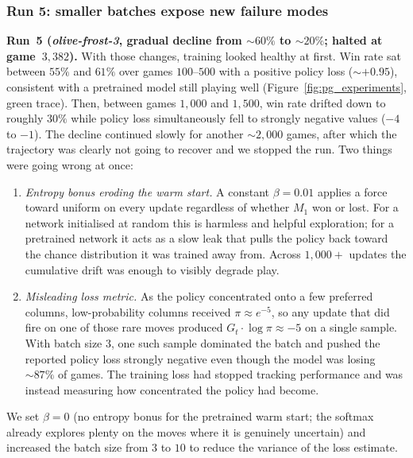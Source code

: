 \documentclass[11pt]{article}
\begin{document}
\subsubsection{Run 5: smaller batches expose new failure modes}
\label{sssec:pg_run5}

\textbf{Run~5 (\emph{olive-frost-3}, gradual decline from $\sim\!60\%$
to $\sim\!20\%$; halted at game~$3{,}382$).} With those changes,
training looked healthy at first. Win rate sat between $55\%$ and
$61\%$ over games $100$--$500$ with a positive policy loss
($\sim +0.95$), consistent with a pretrained model still playing well
(Figure~\ref{fig:pg_experiments}, green trace). Then, between games
$1{,}000$ and $1{,}500$, win rate drifted down to roughly $30\%$ while
policy loss simultaneously fell to strongly negative values
($-4$ to $-1$). The decline continued slowly for another $\sim 2{,}000$
games, after which the trajectory was clearly not going to recover
and we stopped the run. Two things were going wrong at once:

\begin{enumerate}
    \item \emph{Entropy bonus eroding the warm start.} A
    constant $\beta = 0.01$ applies a force toward uniform on every
    update regardless of whether $M_1$ won or lost. For a network
    initialised at random this is harmless and helpful exploration;
    for a pretrained network it acts as a slow leak that pulls the
    policy back toward the chance distribution it was trained away
    from. Across $1{,}000+$ updates the cumulative drift was enough to
    visibly degrade play.
    \item \emph{Misleading loss metric.} As the policy concentrated
    onto a few preferred columns, low-probability columns received
    $\pi \approx e^{-5}$, so any update that did fire on one of those
    rare moves produced $G_t \cdot \log \pi \approx -5$ on a single
    sample. With batch size $3$, one such sample dominated the batch
    and pushed the reported policy loss strongly negative even though
    the model was losing $\sim\!87\%$ of games. The training loss had
    stopped tracking performance and was instead measuring how
    concentrated the policy had become.
\end{enumerate}

We set $\beta = 0$ (no entropy bonus for the pretrained warm start; the
softmax already explores plenty on the moves where it is genuinely
uncertain) and increased the batch size from $3$ to $10$ to reduce
the variance of the loss estimate.
\end{document}
